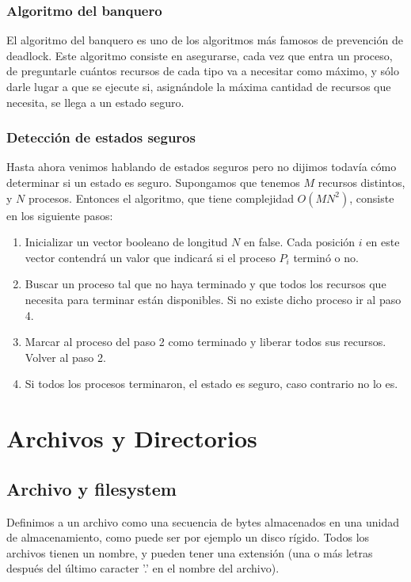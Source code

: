 \documentclass{article}
\begin{document}
\subsubsection{Algoritmo del banquero}

El algoritmo del banquero es uno de los algoritmos m\'as famosos de prevenci\'on de deadlock. Este algoritmo consiste en asegurarse, cada vez que entra un proceso, de preguntarle cu\'antos recursos de cada tipo va a necesitar como m\'aximo, y s\'olo darle lugar a que se ejecute si, asign\'andole la m\'axima cantidad de recursos que necesita, se llega a un estado seguro.

\subsubsection{Detecci\'on de estados seguros}

Hasta ahora venimos hablando de estados seguros pero no dijimos todav\'ia c\'omo determinar si un estado es seguro. Supongamos que tenemos $M$ recursos distintos, y $N$ procesos. Entonces el algoritmo, que tiene complejidad $O(MN^2)$, consiste en los siguiente pasos:

\begin{enumerate}
\item Inicializar un vector booleano de longitud $N$ en false. Cada posición $i$ en este vector contendrá un valor que indicará si el proceso $P_i$ terminó o no.
\item Buscar un proceso tal que no haya terminado y que todos los recursos que necesita para terminar est\'an disponibles. Si no existe dicho proceso ir al paso 4.
\item Marcar al proceso del paso 2 como terminado y liberar todos sus recursos. Volver al paso 2.
\item Si todos los procesos terminaron, el estado es seguro, caso contrario no lo es.
\end{enumerate}

\section{Archivos y Directorios}

\subsection{Archivo y filesystem}

Definimos a un archivo como una secuencia de bytes almacenados en una unidad de almacenamiento, como puede ser por ejemplo un disco r\'igido. Todos los archivos tienen un nombre, y pueden tener una extensi\'on (una o m\'as letras despu\'es del \'ultimo caracter '.' en el nombre del archivo).
\end{document}
